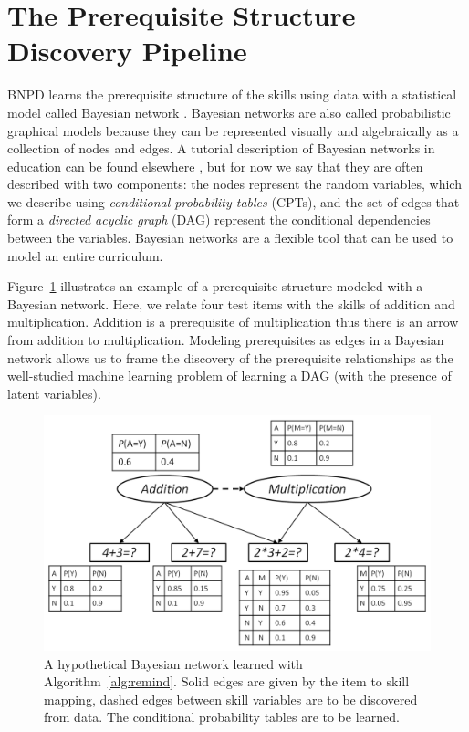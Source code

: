 \documentclass{edm_template}
\begin{document}
\section{The Prerequisite Structure Discovery Pipeline}
\label{sec:pre_pipeline}
BNPD learns the prerequisite structure of the skills using data with a statistical model called Bayesian network \cite{pearl2000causality,spirtes2001causation}.
Bayesian networks are also called probabilistic graphical models  because they can  be represented visually and algebraically as a collection of nodes and edges.
A tutorial description of Bayesian networks in education can be found elsewhere \cite{almond2015bayesian}, 
but for now we say that they are often described with two components: 
the  nodes represent the random variables, which we describe using \textit{conditional probability tables} (CPTs),
and the set of edges that form a \textit{directed acyclic graph} (DAG) represent the conditional dependencies between the variables.
Bayesian networks are a flexible tool that can be used to model an entire curriculum.

Figure~\ref{fig:smexample} illustrates an example of a prerequisite structure modeled with a Bayesian network.
Here, we relate four test items with the skills of addition and multiplication.
Addition is a prerequisite of multiplication thus there is an arrow from addition to multiplication.
Modeling prerequisites as edges in a Bayesian network allows us to frame the discovery of the prerequisite relationships as the well-studied machine learning problem of learning a DAG (with the presence of latent variables).


\begin{figure}
	\begin{center}
		\includegraphics[width=1.0\linewidth]{figures/studentmodel.png}
	\end{center}
	\caption{A hypothetical Bayesian network learned with Algorithm~\ref{alg:remind}. 
		Solid edges are given by the item to skill mapping, dashed edges between skill variables are to be discovered from data.
		The conditional probability tables are to be learned.}
	\label{fig:smexample} 
\end{figure} 
\end{document}
